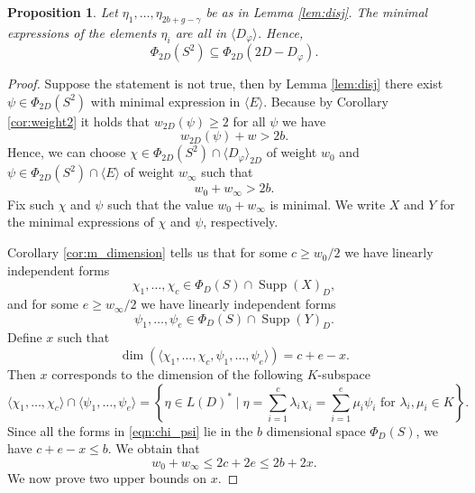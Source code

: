 \documentclass[12pt]{amsart}
\renewcommand{\leq}{\leqslant}
\renewcommand{\geq}{\geqslant}
\DeclareMathOperator{\Supp}{Supp}
\newtheorem{proposition}[theorem]{Proposition}
\theoremstyle{definition}
\newcommand{\divi}[1]{\langle #1 \rangle}
\begin{document}
	\begin{proposition}\label{prop:main}
		Let $\eta_1, \ldots, \eta_{2b + g -\gamma}$ be as in Lemma \ref{lem:disj}. The minimal expressions of the elements $\eta_i$ are all in $\divi {D_{\varphi}}$. Hence, $$\Phi_{2D}(S^2) \subseteq \Phi_{2D}(2D - D_\varphi).$$ 
	\end{proposition}
	\begin{proof}
		Suppose the statement is not true, then by Lemma \ref{lem:disj} there exist $\psi \in \Phi_{2D}(S^2)$ with minimal expression in $\divi E$. Because by Corollary \ref{cor:weight2} it holds that $w_{2D}(\psi) \geq 2$ for all $\psi$ we have
		$$w_{2D}(\psi) + w > 2b.$$ 
		Hence, we can choose $\chi \in \Phi_{2D}(S^2)\cap \divi{D_\varphi}_{2D}$ of weight $w_0$ and $\psi \in \Phi_{2D}(S^2) \cap \divi E$ of weight $w_\infty$ such that 
		\begin{equation*}
			w_0 + w_\infty > 2b. \label{eqn:w0_winf}
		\end{equation*}
		Fix such $\chi$ and $\psi$ such that the value $w_0 + w_\infty$ is minimal. We write $X$ and $Y$ for the minimal expressions of $\chi$ and $\psi$, respectively. 
		
		Corollary \ref{cor:m_dimension} tells us that for some $c \geq w_{0}/2$ we have linearly independent forms 
		$$\chi_1, \ldots, \chi_c \in \Phi_D(S) \cap \Supp(X)_D,$$
		and for some $e \geq w_\infty/2$ we have linearly independent forms $$\psi_1, \ldots, \psi_e \in \Phi_D(S) \cap \Supp(Y)_D.$$ 
		Define $x$ such that
		\begin{equation}
			\dim \left(\langle \chi_1, \ldots, \chi_c, \psi_1, \ldots, \psi_e \rangle \right) = c + e - x \label{eqn:chi_psi}.
		\end{equation}
		Then $x$ corresponds to the dimension of the following $K$-subspace
		\begin{equation}
			\langle \chi_1,\ldots,\chi_c\rangle
			\cap
			\langle \psi_1,\ldots,\psi_e\rangle = \left\{ \eta \in L(D)^\ast \mid \eta = \sum_{i=1}^c \lambda_i \chi_i = \sum_{i=1}^e \mu_i \psi_i \text{ for } \lambda_i, \mu_i \in K \right\}.\label{eqn:dim_x}
		\end{equation}
		Since all the forms in \eqref{eqn:chi_psi} lie in the $b$ dimensional space $\Phi_D(S)$, we have $c + e - x \leq b$. We obtain that
		\begin{equation}\label{EQ:bound0}
			w_0 + w_\infty \leq 2c + 2e \leq 2b + 2x.
		\end{equation}
		We now prove two upper bounds on $x$. 
		

\end{proof}
\end{document}
